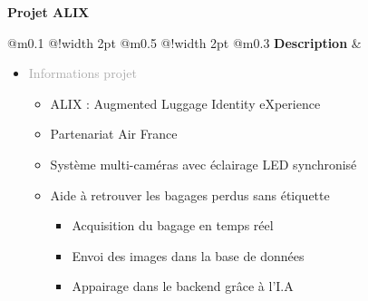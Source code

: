 \documentclass{article}
\begin{document}
\vspace*{0cm} %

\vfill %

\begin{center}
    \textcolor{secondaryBlue}{\textbf{Projet ALIX}}
\end{center}


\begin{tabular}
    {
        @{}m{}
        @{\hspace{0.001\textwidth}}!{\color{secondaryBlue}\vline width 2pt}
        @{}m{0.5\textwidth}
        @{\hspace{0.025\textwidth}}!{\color{secondaryBlue}\vline width 2pt}
        @{}m{0.3\textwidth}
    }
    \textcolor{secondaryBlue}{\textbf{Description}}           
    &
    \begin{itemize}[label={}, topsep=8pt, partopsep=0pt, itemsep=0.5pt, parsep=2pt, after=\vspace*{-\baselineskip}]
        \setlength{\itemsep}{10pt} 
        \item \textcolor{darkGray}{Informations projet}
        \begin{itemize}[label={\textcolor{gray!80}{\checkmark}}, topsep=8pt, partopsep=0pt, itemsep=0.5pt, parsep=2pt] 
            \item \textcolor{gray!80}{ALIX : Augmented Luggage Identity eXperience}
            \item \textcolor{gray!80}{Partenariat Air France}
            \item \textcolor{gray!80}{Système multi-caméras avec éclairage LED synchronisé}
            \item \textcolor{gray!80}{Aide à retrouver les bagages perdus sans étiquette}
            \begin{itemize}
                [label={\textcolor{gray!80}{$\triangleright$}}, topsep=0pt, partopsep=0pt, itemsep=0.5pt, parsep=2pt] 
                \item \textcolor{gray!80}{Acquisition du bagage en temps réel}
                \item \textcolor{gray!80}{Envoi des images dans la base de données}
                \item \textcolor{gray!80}{Appairage dans le backend grâce à l'I.A}
            \end{itemize}
        \end{itemize}
    \end{itemize}

\end{tabular}
\end{document}
